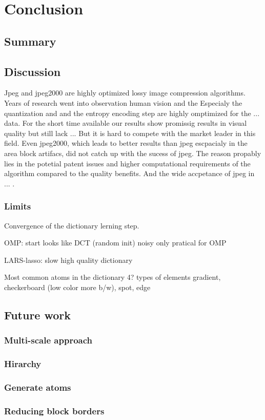 \chapter{Conclusion}
\section{Summary} %

\section{Discussion}

Jpeg and jpeg2000 are highly optimized lossy image compression algorithms. 
Years of research went into observation human vision and the 
Especialy the quantization and and the entropy encoding step are highly omptimized for the ... data.
For the short time available our results show promissig results in visual quality but still lack ...
But it is hard to compete with the market leader in this field.  Even jpeg2000, which leads to better results than jpeg 
escpacialy in the area block artifacs, did not catch up with the sucess of jpeg. 
The reason propably lies in the potetial patent issues and higher computational requirements of the algorithm compared
to the quality benefits. And the wide accpetance of jpeg in ... .

\subsection*{Limits}
Convergence of the dictionary lerning step.

OMP:
  start looks like DCT (random init)
  noisy
  only pratical for OMP

LARS-lasso:
  slow 
  high quality dictionary

  Most common atoms in the dictionary 
  4? types of elements
  gradient, checkerboard (low color more b/w), spot, edge

\section{Future work}

\subsection*{Multi-scale approach}
\subsection*{Hirarchy}
\subsection*{Generate atoms}

\subsection*{Reducing block borders}
